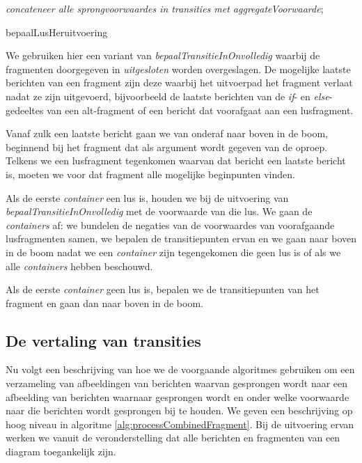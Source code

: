 \begin{algorithm}
{{{{	\textit{concateneer alle sprongvoorwaardes in transities met aggregateVoorwaarde}; \\
	}
	}
	}}
	\caption{bepaalLusHeruitvoering}
	\label{alg:calculateLoopReentry}
\end{algorithm}

We gebruiken hier een variant van \textit{bepaalTransitieInOnvolledig} waarbij de fragmenten doorgegeven in \textit{uitgesloten} worden overgeslagen.
De mogelijke laatste berichten van een fragment zijn deze waarbij het uitvoerpad het fragment verlaat nadat ze zijn uitgevoerd, bijvoorbeeld de laatste berichten van de \textit{if}- en \textit{else}-gedeeltes van een alt-fragment of een bericht dat voorafgaat aan een lusfragment.

Vanaf zulk een laatste bericht gaan we van onderaf naar boven in de boom, beginnend bij het fragment dat als argument wordt gegeven van de oproep. Telkens we een lusfragment tegenkomen waarvan dat bericht een laatste bericht is, moeten we voor dat fragment alle mogelijke beginpunten vinden.

Als de eerste \textit{container} een lus is, houden we bij de uitvoering van \textit{bepaalTransitieInOnvolledig} met de voorwaarde van die lus. We gaan de \textit{containers} af: we bundelen de negaties van de voorwaardes van voorafgaande lusfragmenten samen, we bepalen de transitiepunten ervan en we gaan naar boven in de boom nadat we een \textit{container} zijn tegengekomen die geen lus is of als we alle \textit{containers} hebben beschouwd.

Als de eerste \textit{container} geen lus is, bepalen we de transitiepunten van het fragment en gaan dan naar boven in de boom.

\subsection{De vertaling van transities}\label{sec:process-frag}

Nu volgt een beschrijving van hoe we de voorgaande algoritmes gebruiken om een verzameling van afbeeldingen van berichten waarvan gesprongen wordt naar een afbeelding van berichten waarnaar gesprongen wordt en onder welke voorwaarde naar die berichten wordt gesprongen bij te houden. We geven een beschrijving op hoog niveau in algoritme \ref{alg:processCombinedFragment}. Bij de uitvoering ervan werken we vanuit de veronderstelling dat alle berichten en fragmenten van een diagram toegankelijk zijn.

